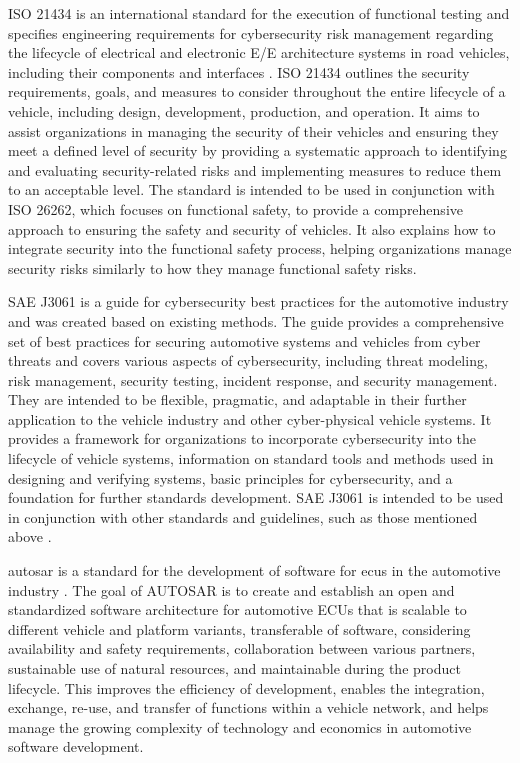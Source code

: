 ISO 21434 is an international standard for the execution of functional testing and specifies engineering requirements for cybersecurity risk 
management regarding the lifecycle of electrical and electronic E/E architecture systems in road vehicles, including their components and interfaces \cite{iso21434}.
ISO 21434 outlines the security requirements, goals, and measures to consider throughout the entire lifecycle of a vehicle, including design, development, production, and operation. 
It aims to assist organizations in managing the security of their vehicles and ensuring they meet a defined level of security by providing a systematic approach to identifying and evaluating security-related risks and implementing measures to reduce them to an acceptable level. 
The standard is intended to be used in conjunction with ISO 26262, which focuses on functional safety, to provide a comprehensive approach to ensuring the safety and security of vehicles. 
It also explains how to integrate security into the functional safety process, helping organizations manage security risks similarly to how they manage functional safety risks.

SAE J3061 is a guide for cybersecurity best practices for the automotive industry and was created based on existing methods. 
The guide provides a comprehensive set of best practices for securing automotive systems and vehicles from cyber threats and covers various aspects of cybersecurity, including threat modeling, risk management, security testing, incident response, and security management.
They are intended to be flexible, pragmatic, and adaptable in their further application to the vehicle industry and other cyber-physical vehicle systems. 
It provides a framework for organizations to incorporate cybersecurity into the lifecycle of vehicle systems, information on standard tools and methods used in designing and verifying systems, basic principles for cybersecurity, and a foundation for further standards development. 
SAE J3061 is intended to be used in conjunction with other standards and guidelines, such as those mentioned above \cite{sae_j3061}. 

\gls{autosar} is a standard for the development of software for \gls{ecu}s in the automotive industry \cite{autosar}.
The goal of AUTOSAR is to create and establish an open and standardized software architecture for automotive ECUs that is scalable to different vehicle and platform variants, 
transferable of software, considering availability and safety requirements, collaboration between various partners, sustainable use of natural resources, 
and maintainable during the product lifecycle. 
This improves the efficiency of development, enables the integration, exchange, re-use, and transfer of functions within a vehicle network, 
and helps manage the growing complexity of technology and economics in automotive software development.\\

